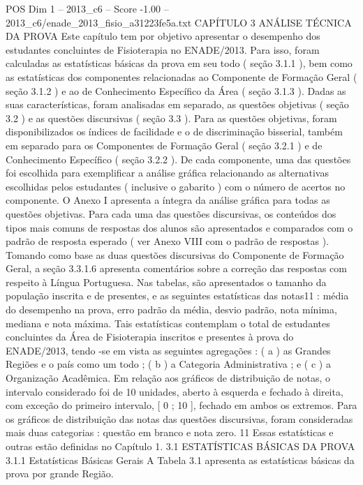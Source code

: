 \begin{textsample}{POS Dim 1 – 2013\_c6 – Score -1.00 – 2013\_c6/enade\_2013\_fisio\_a31223fe5a.txt}  \label{ex:f1_pos_173}
CAPÍTULO 3 ANÁLISE TÉCNICA DA PROVA Este capítulo tem por objetivo apresentar o desempenho dos estudantes concluintes de Fisioterapia no ENADE/2013.
Para isso, foram calculadas as estatísticas básicas da prova em seu todo ( seção 3.1.1 ), bem como as estatísticas dos componentes relacionadas ao Componente de Formação Geral ( seção 3.1.2 ) e ao de Conhecimento Específico da Área ( seção 3.1.3 ).
Dadas as suas características, foram analisadas em separado, as questões objetivas ( seção 3.2 ) e as questões discursivas ( seção 3.3 ).
Para as questões objetivas, foram disponibilizados os índices de facilidade e o de discriminação bisserial, também em separado para os Componentes de Formação Geral ( seção 3.2.1 ) e de Conhecimento Específico ( seção 3.2.2 ).
De cada componente, uma das questões foi escolhida para exemplificar a análise gráfica relacionando as alternativas escolhidas pelos estudantes ( inclusive o gabarito ) com o número de acertos no componente.
O Anexo I apresenta a íntegra da análise gráfica para todas as questões objetivas.
Para cada uma das questões discursivas, os conteúdos dos tipos mais comuns de respostas dos alunos são apresentados e comparados com o padrão de resposta esperado ( ver Anexo VIII com o padrão de respostas ).
Tomando como base as duas questões discursivas do Componente de Formação Geral, a seção 3.3.1.6 apresenta comentários sobre a correção das respostas com respeito à Língua Portuguesa.
Nas tabelas, são apresentados o tamanho da população inscrita e de presentes, e as seguintes estatísticas das notas11 : média do desempenho na prova, erro padrão da média, desvio padrão, nota mínima, mediana e nota máxima.
Tais estatísticas contemplam o total de estudantes concluintes da Área de Fisioterapia inscritos e presentes à prova do ENADE/2013, tendo -se em vista as seguintes agregações : ( a ) as Grandes Regiões e o país como um todo ; ( b ) a Categoria Administrativa ; e ( c ) a Organização Acadêmica.
Em relação aos gráficos de distribuição de notas, o intervalo considerado foi de 10 unidades, aberto à esquerda e fechado à direita, com exceção do primeiro intervalo, [ 0 ; 10 ], fechado em ambos os extremos.
Para os gráficos de distribuição das notas das questões discursivas, foram consideradas mais duas categorias : questão em branco e nota zero. 11 Essas estatísticas e outras estão definidas no Capítulo 1. 3.1 ESTATÍSTICAS BÁSICAS DA PROVA 3.1.1 Estatísticas Básicas Gerais A Tabela 3.1 apresenta as estatísticas básicas da prova por grande Região.

\end{textsample}
